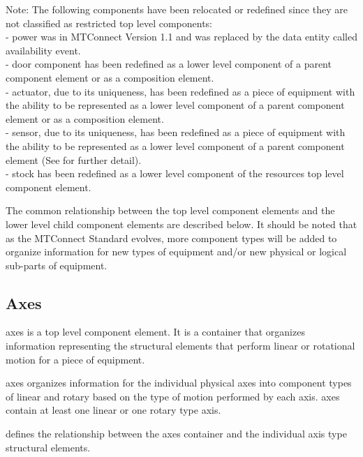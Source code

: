 \begin{note}
Note: \notesign \notesign The following components have been relocated or redefined since they are not classified as restricted \gls{top level} components:\\- \gls{power} was \DEPRECATED in MTConnect Version 1.1 and was replaced by the \gls{data entity} called \gls{availability event}.\\- \gls{door component} has been redefined as a \gls{lower level} component of a parent \gls{component} element or as a \gls{composition} element.\\- \gls{actuator}, due to its uniqueness, has been redefined as a piece of equipment with the ability to be represented as a \gls{lower level} component of a parent \gls{component} element or as a \gls{composition} element.\\- \gls{sensor}, due to its uniqueness, has been redefined as a piece of equipment with the ability to be represented as a \gls{lower level} component of a parent \gls{component} element (See  for further detail).\\ - \gls{stock} has been redefined as a \gls{lower level} component of the \gls{resources} \gls{top level} \gls{component} element.

\end{note}

The common relationship between the \gls{top level} \gls{component} elements and the \gls{lower level} child \gls{component} elements are described below.  It should be noted that as the MTConnect Standard evolves, more \gls{component} types will be added to organize information for new types of equipment and/or new physical or logical sub-parts of equipment. 

\subsection{Axes}

\gls{axes} is a \gls{top level} \gls{component} element.  It is a container that organizes information representing the \glspl{structural element} that perform linear or rotational motion for a piece of equipment.

\gls{axes} organizes information for the individual physical axes into \gls{component} types of \gls{linear} and \gls{rotary} based on the type of motion performed by each axis.  \gls{axes} \must contain at least one \gls{linear} or one \gls{rotary} type axis.

 defines the relationship between the \gls{axes} container and the individual axis type \glspl{structural element}.

